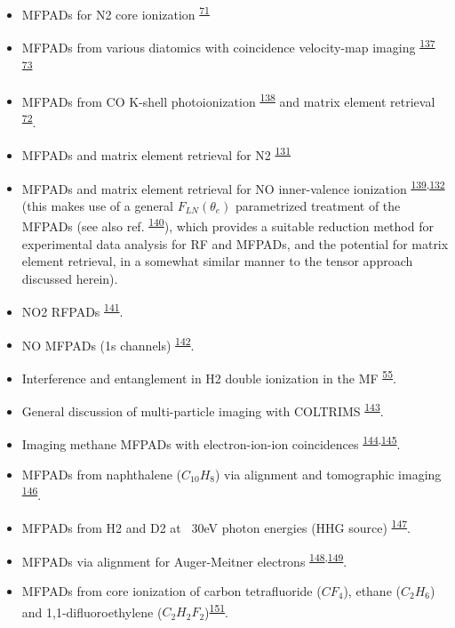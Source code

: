 \documentclass[10pt]{article}
\begin{document}
\begin{itemize}
\item MFPADs for N2 core ionization \textsuperscript{\hyperref[csl:71]{71}}
\item MFPADs from various diatomics with coincidence velocity-map imaging \textsuperscript{\hyperref[csl:137]{137}} \textsuperscript{\hyperref[csl:73]{73}}
\item MFPADs from CO K-shell photoionization \textsuperscript{\hyperref[csl:138]{138}} and matrix element retrieval \textsuperscript{\hyperref[csl:72]{72}}.
\item MFPADs and matrix element retrieval for N2 \textsuperscript{\hyperref[csl:131]{131}}
\item MFPADs and matrix element retrieval for NO inner-valence ionization \textsuperscript{\hyperref[csl:139]{139},\hyperref[csl:132]{132}} (this makes use of a general $F_{LN}(\theta_e)$ parametrized treatment of the MFPADs (see also ref. \textsuperscript{\hyperref[csl:140]{140}}), which provides a suitable reduction method for experimental data analysis for RF and MFPADs, and the potential for matrix element retrieval, in a somewhat similar manner to the tensor approach discussed herein). %
\item NO2 RFPADs \textsuperscript{\hyperref[csl:141]{141}}.
\item NO MFPADs (1s channels) \textsuperscript{\hyperref[csl:142]{142}}.
\item Interference and entanglement in H2 double ionization in the MF \textsuperscript{\hyperref[csl:55]{55}}.
\item General discussion of multi-particle imaging with COLTRIMS \textsuperscript{\hyperref[csl:143]{143}}.
\item Imaging methane MFPADs with electron-ion-ion coincidences \textsuperscript{\hyperref[csl:144]{144},\hyperref[csl:145]{145}}.
\item MFPADs from naphthalene ($C_{10}H_{8}$) via alignment and tomographic imaging \textsuperscript{\hyperref[csl:146]{146}}.
\item MFPADs from H2 and D2 at ~30eV photon energies (HHG source) \textsuperscript{\hyperref[csl:147]{147}}.
\item MFPADs via alignment for Auger-Meitner electrons \textsuperscript{\hyperref[csl:148]{148},\hyperref[csl:149]{149}}.
\item MFPADs from core ionization of carbon tetrafluoride ($CF_4$), ethane ($C_2H_6$) and 1,1-difluoroethylene ($C_2 H_2 F_2$)\textsuperscript{\hyperref[csl:151]{151}}.
\end{itemize}
\end{document}
